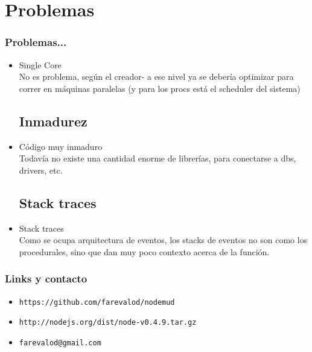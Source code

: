 \documentclass{beamer}
\begin{document}
\section{Problemas}
\begin{frame}
\frametitle{Problemas...}
\begin{itemize}
\subsection{Single Core}
\item Single Core\\
No es problema, seg\'un el creador- a ese nivel ya se deber\'ia optimizar para correr en m\'aquinas paralelas (y para los procs est\'a el scheduler del sistema)
\subsection{Inmadurez}
\item C\'odigo muy inmaduro\\
Todav\'ia no existe una cantidad enorme de librer\'ias, para conectarse a dbs, drivers, etc.
\subsection{Stack traces}
\item Stack traces\\
Como se ocupa arquitectura de eventos, los stacks de eventos no son como los procedurales, sino que dan muy poco contexto acerca de la funci\'on.
\end{itemize}
\end{frame}
\begin{frame}
\frametitle{Links y contacto}
\begin{itemize}
\item \texttt{https://github.com/farevalod/nodemud}
\item \texttt{http://nodejs.org/dist/node-v0.4.9.tar.gz}
\item \texttt{farevalod@gmail.com}
\end{itemize}
\end{frame}
\end{document}
